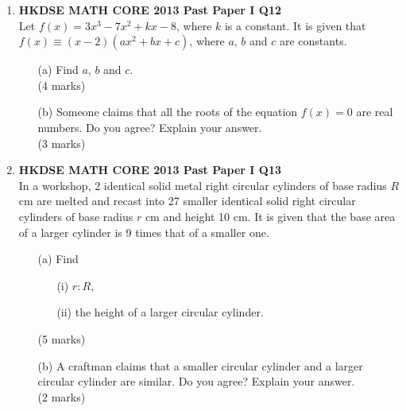 \documentclass[12pt]{article}
\begin{document}
\begin{enumerate}
	\item \textbf{HKDSE MATH CORE 2013 Past Paper I Q12}\\
	Let  $f(x) = 3x^3 - 7x^2 + kx - 8$, where $k$ is a constant. It is given that $f(x) \equiv (x - 2)(ax^2 + bx + c)$, where $a$, $b$ and $c$ are constants.
	\begin{enumerate}
		\item[(a)] Find $a$, $b$ and $c$. \\(4 marks)
		\item[(b)] Someone claims that all the roots of the equation  $f(x) = 0$ are real numbers. Do you agree? Explain your answer. \\(3 marks)
	\end{enumerate}

	\item \textbf{HKDSE MATH CORE 2013 Past Paper I Q13}\\
	In a workshop, 2 identical solid metal right circular cylinders of base radius $R$ cm are melted and recast into 27 smaller identical solid right circular cylinders of base radius $r$ cm and height 10 cm. It is given that the base area of a larger cylinder is 9 times that of a smaller one.
	\begin{enumerate}
		\item[(a)] Find
		\begin{enumerate}
			\item[(i)] $r : R$,
			\item[(ii)] the height of a larger circular cylinder.
		\end{enumerate}
		(5 marks)
		\item[(b)] A craftman claims that a smaller circular cylinder and a larger circular cylinder are similar. Do you agree? Explain your answer. \\(2 marks)
	\end{enumerate}


\end{enumerate}
\end{document}
